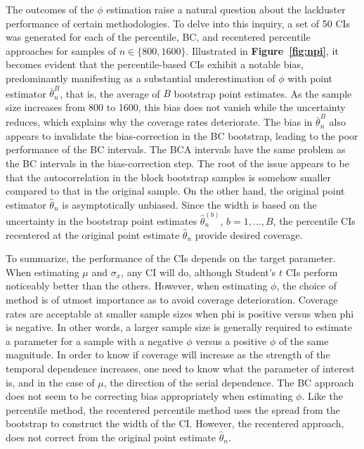 \documentclass[10pt]{article}
\begin{document}
The outcomes of the $\phi$ estimation raise a natural question about the 
lackluster performance of certain methodologies. To delve into this inquiry, a
set of 50 CIs was generated for each of the percentile, BC, and recentered
percentile  approaches for samples of $n \in \{800, 1600\}$. Illustrated in 
\textbf{Figure~\ref{fig:npi}}, it becomes evident that the percentile-based CIs 
exhibit a notable bias, predominantly manifesting as a substantial 
underestimation of $\phi$ with point estimator $\bar\theta_n^B$, that is, the 
average of $B$ bootstrap point estimates. As the sample size increases from 800 
to 1600, this bias does not vanish while the uncertainty reduces, which explains 
why the coverage rates deteriorate. The bias in $\bar\theta_n^B$ also appears to 
invalidate the bias-correction in the BC bootstrap, leading to the poor 
performance of the BC intervals. The BCA intervals have the same problem as the 
BC intervals in the bias-correction step. The root of the issue appears to be 
that the autocorrelation in the block bootstrap samples is somehow smaller 
compared to that in the original sample. On the other hand, the original point 
estimator $\hat\theta_n$ is asymptotically unbiased. Since the width is based on 
the uncertainty in the bootstrap point estimates $\hat\theta_n^{(b)}$, 
$b = 1, \ldots, B$, the percentile CIs recentered at the original point estimate
$\hat\theta_n$ provide desired coverage.


To summarize, the performance of the CIs depends on the target parameter. When
estimating $\mu$ and $\sigma_x$, any CI will do, although Student's $t$ CIs
perform noticeably better than the others.
However, when estimating $\phi$, the 
choice of method is of utmost importance as to avoid coverage deterioration. 
Coverage rates are acceptable at smaller sample 
sizes when phi is positive versus when phi is negative. In
other words, a larger sample size is generally required to estimate a 
parameter for a sample with a negative $\phi$ versus a positive $\phi$ of the 
same magnitude. In order 
to know if coverage will increase as the strength of the temporal dependence 
increases, one need to know what the parameter of interest is, and in the case 
of $\mu$, the direction of the serial dependence. The BC approach does not seem 
to be correcting bias appropriately when estimating $\phi$. Like the percentile 
method, the recentered percentile method uses the spread from the bootstrap to 
construct the width of the CI. However, the recentered approach, does not 
correct from the original point estimate $\hat\theta_n$.
\end{document}
